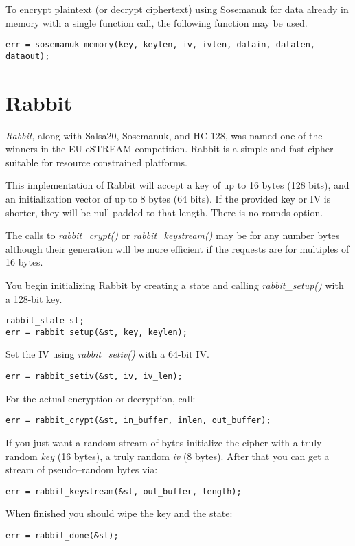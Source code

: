 \documentclass[synpaper]{book}
\newcommand{\mysection}[1]    %
	{                   %
	\section{#1}
   \markboth{\textsf{www.libtom.net}}{\thesection ~ {#1}}
	}
\begin{document}
To encrypt plaintext (or decrypt ciphertext) using Sosemanuk for data already in
memory with a single function call, the following function may be used.
\begin{verbatim}
err = sosemanuk_memory(key, keylen, iv, ivlen, datain, datalen, dataout);
\end{verbatim}

\mysection{Rabbit}

\textit{Rabbit}, along with Salsa20, Sosemanuk, and HC-128, was named one of the winners
in the EU eSTREAM competition.  Rabbit is a simple and fast cipher suitable for resource
constrained platforms.

This implementation of Rabbit will accept a key of up to 16 bytes (128 bits), and an
initialization vector of up to 8 bytes (64 bits).  If the provided key or IV is shorter,
they will be null padded to that length.  There is no rounds option.

The calls to \textit{rabbit\_crypt()} or \textit{rabbit\_keystream()} may be for any
number bytes although their generation will be more efficient if the requests are for
multiples of 16 bytes.

You begin initializing Rabbit by creating a state and calling \textit{rabbit\_setup()}
with a 128-bit key.
\begin{verbatim}
rabbit_state st;
err = rabbit_setup(&st, key, keylen);
\end{verbatim}

Set the IV using \textit{rabbit\_setiv()} with a 64-bit IV.
\begin{verbatim}
err = rabbit_setiv(&st, iv, iv_len);
\end{verbatim}

For the actual encryption or decryption, call:
\begin{verbatim}
err = rabbit_crypt(&st, in_buffer, inlen, out_buffer);
\end{verbatim}

If you just want a random stream of bytes initialize the cipher with a truly random \textit{key}
(16 bytes), a truly random \textit{iv} (8 bytes). After that you can
get a stream of pseudo--random bytes via:
\begin{verbatim}
err = rabbit_keystream(&st, out_buffer, length);
\end{verbatim}

When finished you should wipe the key and the state:
\begin{verbatim}
err = rabbit_done(&st);
\end{verbatim}
\end{document}
